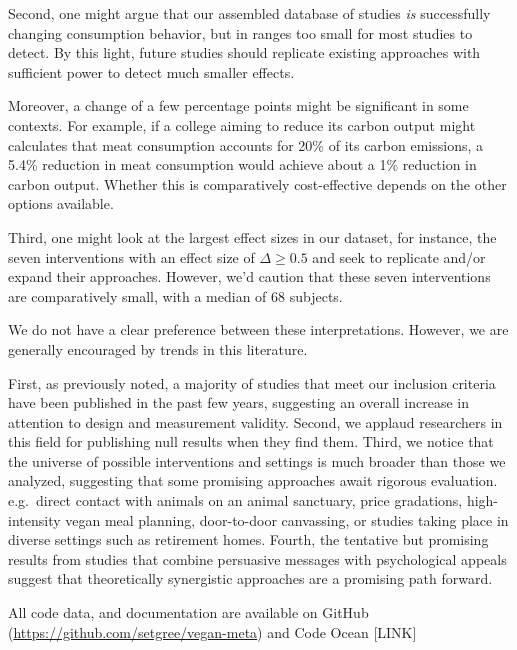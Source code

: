 \documentclass[sn-nature,referee,pdflatex]{sn-jnl}
\begin{document}
Second, one might argue that our assembled database of studies \emph{is}
successfully changing consumption behavior, but in ranges too small for
most studies to detect. By this light, future studies should replicate
existing approaches with sufficient power to detect much smaller
effects.

Moreover, a change of a few percentage points might be significant in
some contexts. For example, if a college aiming to reduce its carbon
output might calculates that meat consumption accounts for 20\% of its
carbon emissions, a 5.4\% reduction in meat consumption
\citep{jalil2023} would achieve about a 1\% reduction in carbon output.
Whether this is comparatively cost-effective depends on the other
options available.

Third, one might look at the largest effect sizes in our dataset, for
instance, the seven interventions with an effect size of
\(\Delta \geq 0.5\)
\citep{bianchi2022, carfora2023, kanchanachitra2020, merrill2009, piester2020}
and seek to replicate and/or expand their approaches. However, we'd
caution that these seven interventions are comparatively small, with a
median of 68 subjects.

We do not have a clear preference between these interpretations.
However, we are generally encouraged by trends in this literature.

First, as previously noted, a majority of studies that meet our
inclusion criteria have been published in the past few years, suggesting
an overall increase in attention to design and measurement validity.
Second, we applaud researchers in this field for publishing null results
when they find them. Third, we notice that the universe of possible
interventions and settings is much broader than those we analyzed,
suggesting that some promising approaches await rigorous evaluation.
e.g.~direct contact with animals on an animal sanctuary, price
gradations, high-intensity vegan meal planning, door-to-door canvassing,
or studies taking place in diverse settings such as retirement homes.
Fourth, the tentative but promising results from studies that combine
persuasive messages with psychological appeals suggest that
theoretically synergistic approaches are a promising path forward.

\backmatter


All code data, and documentation are available on GitHub
(\url{https://github.com/setgree/vegan-meta}) and Code Ocean {[}LINK{]}
\end{document}
